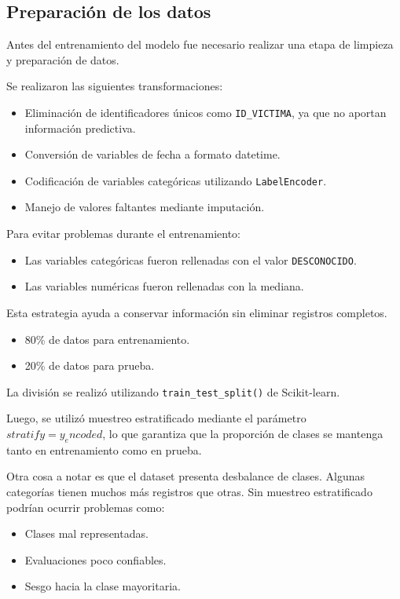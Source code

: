 \subsection{Preparación de los datos}

Antes del entrenamiento del modelo fue necesario realizar una etapa de limpieza y preparación de datos.

Se realizaron las siguientes transformaciones:

\begin{itemize}
    \item Eliminación de identificadores únicos como \texttt{ID\_VICTIMA}, ya que no aportan información predictiva.
    \item Conversión de variables de fecha a formato datetime.
    \item Codificación de variables categóricas utilizando \texttt{LabelEncoder}.
    \item Manejo de valores faltantes mediante imputación.
\end{itemize}

Para evitar problemas durante el entrenamiento:

\begin{itemize}
    \item Las variables categóricas fueron rellenadas con el valor \texttt{DESCONOCIDO}.
    \item Las variables numéricas fueron rellenadas con la mediana.
\end{itemize}

Esta estrategia ayuda a conservar información sin eliminar registros completos.

\begin{itemize}
    \item 80\% de datos para entrenamiento.
    \item 20\% de datos para prueba.
\end{itemize}

La división se realizó utilizando \texttt{train\_test\_split()} de Scikit-learn.

Luego, se utilizó muestreo estratificado mediante el parámetro $stratify = y_encoded$, lo que garantiza que la
proporción de clases se mantenga tanto en entrenamiento como en prueba.

Otra cosa a notar es que el dataset presenta desbalance de clases. Algunas categorías tienen muchos más registros que otras.
Sin muestreo estratificado podrían ocurrir problemas como:

\begin{itemize}
    \item Clases mal representadas.
    \item Evaluaciones poco confiables.
    \item Sesgo hacia la clase mayoritaria.
\end{itemize}

